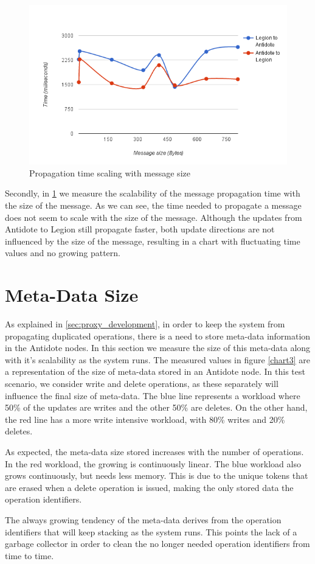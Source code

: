\begin{figure}[h]
\centering
\includegraphics[scale=0.7]{files/chart2.png}
\caption{Propagation time scaling with message size}
\label{chart2}
\end{figure}

Secondly, in \ref{chart2} we  measure the scalability of the message propagation time with the size of the message. As we can see, the time needed to propagate a message does not seem to scale with the size of the message. Although the updates from Antidote to Legion still propagate faster, both update directions are not influenced by the size of the message, resulting in a chart with fluctuating time values and no growing pattern.

\section{Meta-Data Size}
\label{sec:meta-data_size}
As explained in \ref{sec:proxy_development}, in order to keep the system from propagating duplicated operations, there is a need to store meta-data information in the Antidote nodes. In this section we measure the size of this meta-data along with it's scalability as the system runs. The measured values in figure \ref{chart3} are a representation of the size of meta-data stored in an Antidote node. In this test scenario, we consider write and delete operations, as these separately will influence the final size of meta-data. The blue line represents a workload where 50\% of the updates are writes and the other 50\% are deletes. On the other hand, the red line has a more write intensive workload, with 80\% writes and 20\% deletes.\par
	As expected, the meta-data size stored increases with the number of operations. In the red workload, the growing is continuously linear. The blue workload also grows continuously, but needs less memory. This is due to the unique tokens that are erased when a delete operation is issued, making the only stored data the operation identifiers.\par
	The always growing tendency of the meta-data derives from the operation identifiers that will keep stacking as the system runs. This points the lack of a garbage collector in order to clean the no longer needed operation identifiers from time to time.

